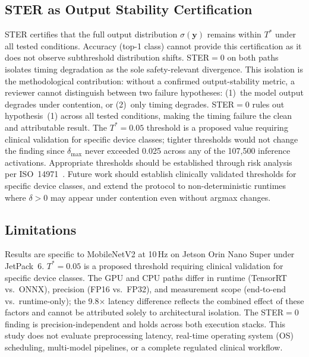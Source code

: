 \documentclass[journal,twoside,9pt]{IEEEtran}
\begin{document}
\subsection{STER as Output Stability Certification}

STER certifies that the full output distribution $\sigma(\mathbf{y})$ remains within
$T^*$ under all tested conditions. Accuracy (top-1 class) cannot provide this
certification as it does not observe subthreshold distribution shifts. STER$=0$ on
both paths isolates timing degradation as the sole safety-relevant divergence.
This isolation is the methodological contribution: without a confirmed output-stability
metric, a reviewer cannot distinguish between two failure hypotheses: (1)~the model
output degrades under contention, or (2)~only timing degrades. STER$=0$ rules out
hypothesis~(1) across all tested conditions, making the timing failure the clean
and attributable result.
The $T^*=0.05$ threshold is a proposed value requiring clinical validation for
specific device classes; tighter thresholds would not change the finding since
$\delta_{\text{max}}$ never exceeded 0.025 across any of the 107,500 inference
activations. Appropriate thresholds should be established through risk analysis
per ISO~14971~\cite{iso14971}.
Future work should establish clinically validated thresholds for specific device
classes, and extend the protocol to non-deterministic runtimes where $\delta>0$
may appear under contention even without argmax changes.

\subsection{Limitations}

Results are specific to MobileNetV2 at 10\,Hz on Jetson Orin Nano Super under
JetPack~6. $T^*=0.05$ is a proposed threshold requiring clinical validation for
specific device classes. The GPU and CPU paths differ in runtime (TensorRT vs.\ ONNX),
precision (FP16 vs.\ FP32), and measurement scope (end-to-end vs.\ runtime-only);
the 9.8$\times$ latency difference reflects the combined effect of these factors and
cannot be attributed solely to architectural isolation. The STER$=0$ finding is
precision-independent and holds across both execution stacks. This study does not
evaluate preprocessing latency, real-time operating system (OS) scheduling,
multi-model pipelines, or a complete regulated clinical workflow.

\end{document}
